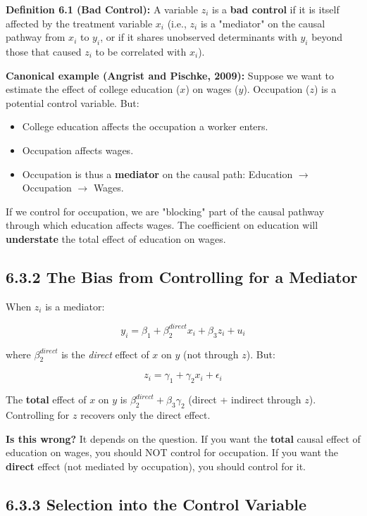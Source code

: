 \textbf{Definition 6.1 (Bad Control):} A variable $z_i$ is a \textbf{bad control} if it is itself affected by the treatment variable $x_i$ (i.e., $z_i$ is a "mediator" on the causal pathway from $x_i$ to $y_i$, or if it shares unobserved determinants with $y_i$ beyond those that caused $z_i$ to be correlated with $x_i$).

\textbf{Canonical example (Angrist and Pischke, 2009):} Suppose we want to estimate the effect of college education ($x$) on wages ($y$). Occupation ($z$) is a potential control variable. But:
\begin{itemize}
\item College education affects the occupation a worker enters.
\item Occupation affects wages.
\item Occupation is thus a \textbf{mediator} on the causal path: Education $\to$ Occupation $\to$ Wages.
\end{itemize}

If we control for occupation, we are "blocking" part of the causal pathway through which education affects wages. The coefficient on education will \textbf{understate} the total effect of education on wages.

\subsection{6.3.2 The Bias from Controlling for a Mediator}

When $z_i$ is a mediator:

\[
y_i = \beta_1 + \beta_2^{direct} x_i + \beta_3 z_i + u_i
\]

where $\beta_2^{direct}$ is the \textit{direct} effect of $x$ on $y$ (not through $z$). But:

\[
z_i = \gamma_1 + \gamma_2 x_i + \epsilon_i
\]

The \textbf{total} effect of $x$ on $y$ is $\beta_2^{direct} + \beta_3 \gamma_2$ (direct + indirect through $z$). Controlling for $z$ recovers only the direct effect.

\textbf{Is this wrong?} It depends on the question. If you want the \textbf{total} causal effect of education on wages, you should NOT control for occupation. If you want the \textbf{direct} effect (not mediated by occupation), you should control for it.

\subsection{6.3.3 Selection into the Control Variable}

